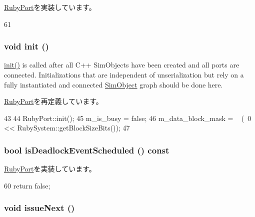 \hyperlink{classRubyPort_ae635736b1bd64144a8f1fc5f42948b21}{RubyPort}を実装しています。


\begin{DoxyCode}
61 {}
\end{DoxyCode}
\hypertarget{classDMASequencer_a02fd73d861ef2e4aabb38c0c9ff82947}{
\subsubsection[{init}]{\setlength{\rightskip}{0pt plus 5cm}void init ()}}
\label{classDMASequencer_a02fd73d861ef2e4aabb38c0c9ff82947}
\hyperlink{classDMASequencer_a02fd73d861ef2e4aabb38c0c9ff82947}{init()} is called after all C++ SimObjects have been created and all ports are connected. Initializations that are independent of unserialization but rely on a fully instantiated and connected \hyperlink{classSimObject}{SimObject} graph should be done here. 

\hyperlink{classRubyPort_a02fd73d861ef2e4aabb38c0c9ff82947}{RubyPort}を再定義しています。


\begin{DoxyCode}
43 {
44     RubyPort::init();
45     m_is_busy = false;
46     m_data_block_mask = ~ (~0 << RubySystem::getBlockSizeBits());
47 }
\end{DoxyCode}
\hypertarget{classDMASequencer_a11ce018fbd3aa89624b06dbdafbd4ef9}{
\subsubsection[{isDeadlockEventScheduled}]{\setlength{\rightskip}{0pt plus 5cm}bool isDeadlockEventScheduled () const}}
\label{classDMASequencer_a11ce018fbd3aa89624b06dbdafbd4ef9}


\hyperlink{classRubyPort_a24d37c70faaaf126b544c2d46ea70ce2}{RubyPort}を実装しています。


\begin{DoxyCode}
60 { return false; }
\end{DoxyCode}
\hypertarget{classDMASequencer_ac3acb51a52b90c6e61fdddba7434fd9b}{
\subsubsection[{issueNext}]{\setlength{\rightskip}{0pt plus 5cm}void issueNext ()}}
\label{classDMASequencer_ac3acb51a52b90c6e61fdddba7434fd9b}



